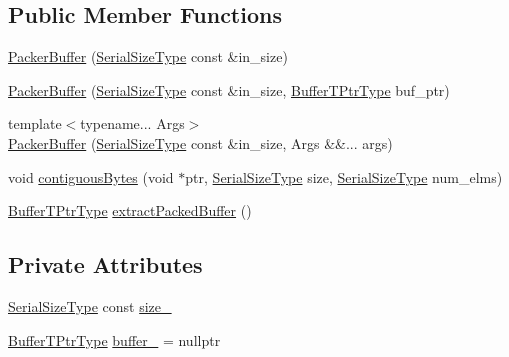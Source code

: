 \subsection*{Public Member Functions}
\begin{DoxyCompactItemize}
\item 
\hyperlink{structcheckpoint_1_1_packer_buffer_abd97aedeba81d8570fa047f3efb4220d}{Packer\+Buffer} (\hyperlink{namespacecheckpoint_a083f6674da3f94c2901b18c6d238217c}{Serial\+Size\+Type} const \&in\+\_\+size)
\item 
\hyperlink{structcheckpoint_1_1_packer_buffer_a4bdbbf8f84eb065c5c0b02d39a480308}{Packer\+Buffer} (\hyperlink{namespacecheckpoint_a083f6674da3f94c2901b18c6d238217c}{Serial\+Size\+Type} const \&in\+\_\+size, \hyperlink{structcheckpoint_1_1_packer_buffer_a081ec628050e8b173e413271fa070c26}{Buffer\+T\+Ptr\+Type} buf\+\_\+ptr)
\item 
{\footnotesize template$<$typename... Args$>$ }\\\hyperlink{structcheckpoint_1_1_packer_buffer_aded90d4aacc6376a95579d249751496d}{Packer\+Buffer} (\hyperlink{namespacecheckpoint_a083f6674da3f94c2901b18c6d238217c}{Serial\+Size\+Type} const \&in\+\_\+size, Args \&\&... args)
\item 
void \hyperlink{structcheckpoint_1_1_packer_buffer_aa8bf2d721f834a607a48164086aec078}{contiguous\+Bytes} (void $\ast$ptr, \hyperlink{namespacecheckpoint_a083f6674da3f94c2901b18c6d238217c}{Serial\+Size\+Type} size, \hyperlink{namespacecheckpoint_a083f6674da3f94c2901b18c6d238217c}{Serial\+Size\+Type} num\+\_\+elms)
\item 
\hyperlink{structcheckpoint_1_1_packer_buffer_a081ec628050e8b173e413271fa070c26}{Buffer\+T\+Ptr\+Type} \hyperlink{structcheckpoint_1_1_packer_buffer_abc144f3a5d61a7eb886bd57241e7ed7e}{extract\+Packed\+Buffer} ()
\end{DoxyCompactItemize}
\subsection*{Private Attributes}
\begin{DoxyCompactItemize}
\item 
\hyperlink{namespacecheckpoint_a083f6674da3f94c2901b18c6d238217c}{Serial\+Size\+Type} const \hyperlink{structcheckpoint_1_1_packer_buffer_aac4e52e04c38fd611a6ed75e0d0df0a2}{size\+\_\+}
\item 
\hyperlink{structcheckpoint_1_1_packer_buffer_a081ec628050e8b173e413271fa070c26}{Buffer\+T\+Ptr\+Type} \hyperlink{structcheckpoint_1_1_packer_buffer_ab07bd403ce6f2e644ff92532f9e363cb}{buffer\+\_\+} = nullptr
\end{DoxyCompactItemize}

